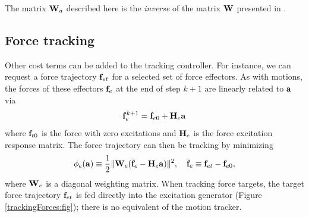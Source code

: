 \begin{sideblock}
The matrix ${\bf W}_a$ described here is the {\it inverse} of the matrix ${\bf W}$
presented in \cite{lloyd2012artisynth}.
\end{sideblock}

\subsection{Force tracking}
\label{ForceTracking:sec}

Other cost terms can be added to the tracking controller.  For
instance, we can request a force trajectory ${\bf f}_{et}$ for a selected set
of force effectors. As with motions, the forces of these effectors
${\bf f}_e$ at the end of step $k+1$ are linearly related to ${\bf a}$ via
%
\begin{equation*}
{\bf f}_e^{k+1} = {\bf f}_{e0} + {\bf H}_e {\bf a}
\end{equation*}
%
where ${\bf f}_{t0}$ is the force with zero excitations and ${\bf H}_e$ is
the force excitation response matrix. The force trajectory can
then be tracking by minimizing
%
\begin{equation}
\phi_e({\bf a}) \equiv \frac{1}{2} \| {\bf W}_e (\bar{{\bf f}}_e - {\bf H}_e {\bf a}) \|^2, \quad
\bar{{\bf f}}_e \equiv {\bf f}_{et} - {\bf f}_{e0},
\label{forceEffectorCostTerm:eqn}	
\end{equation}
%
where ${\bf W}_e$ is a diagonal weighting matrix.
When tracking force targets, the target force trajectory ${\bf f}_{et}$ is fed
directly into the excitation generator (Figure \ref{trackingForces:fig}); there
is no equivalent of the motion tracker.

